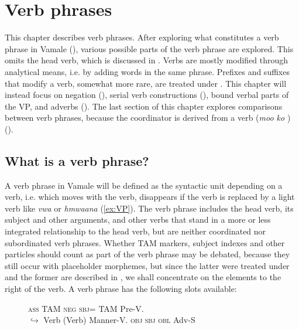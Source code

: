 \chapter{Verb phrases} 
\label{ChapterVP} 

This chapter describes verb phrases. After exploring what constitutes a verb phrase in Vamale (), various possible parts of the verb phrase are explored. This omits the head verb, which is discussed in . 
Verbs are mostly modified through analytical means, i.e. by adding words in the same phrase. Prefixes and suffixes that modify a verb, somewhat more rare, are treated under . This chapter will instead focus on negation (), serial verb constructions (), bound verbal parts of the VP, and adverbs (). The last section of this chapter explores comparisons between verb phrases, because the coordinator is derived from a verb (\textit{moo ko} ) ().

\section{What is a verb phrase?}
\label{sec:VPIntro}
A verb phrase in Vamale will be defined as the syntactic unit depending on a verb, i.e. which moves with the verb, disappears if the verb is replaced by a light verb like \textit{vwa}  or \textit{hmwaana}  (\ref{ex:VP}). The verb phrase includes the head verb, its subject and other arguments, and other verbs that stand in a more or less integrated relationship to the head verb, but are neither coordinated nor subordinated verb phrases. Whether TAM markers, subject indexes and other particles should count as part of the verb phrase may be debated, because they still occur with placeholder morphemes, but since the latter were treated under  and the former are described in , we shall concentrate on the elements to the right of the verb. A verb phrase has the following slots available:

\begin{figure}[H]
\raggedright
	\textsc{ass} \quad  TAM \quad \textsc{neg} \quad \textsc{sbj}= \quad  TAM  \quad Pre-V. \\
	 \quad  $\hookrightarrow$   \quad Verb \quad  (Verb) \quad  Manner-V.  \textsc{obj} \quad  \textsc{sbj} \quad  \textsc{obl} \quad  Adv-S\\ %
\end{figure}

